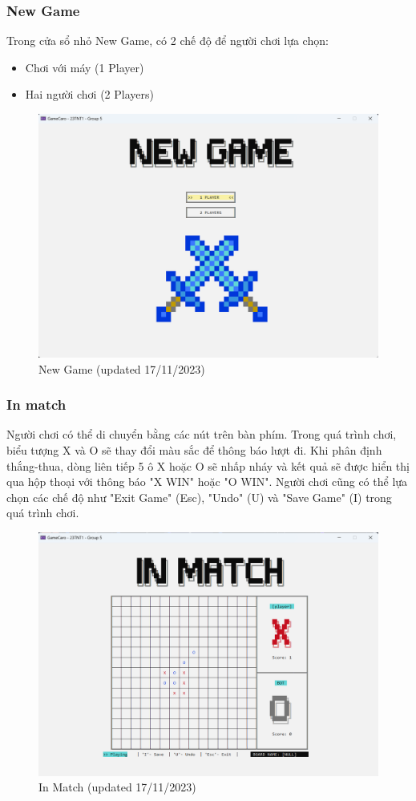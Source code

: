 \subsubsection{New Game}
Trong cửa sổ nhỏ New Game, có 2 chế độ để người chơi lựa chọn:
\begin{itemize}
    \item Chơi với máy (1 Player)
    \item Hai người chơi (2 Players)
\end{itemize}
\begin{figure}[H]
    \centering
    \includegraphics[scale=.4]{img/newgame.png}
    \caption{New Game (updated 17/11/2023)}
\end{figure}
\clearpage
\subsubsection{In match}
Người chơi có thể di chuyển bằng các nút trên bàn phím. Trong quá trình chơi, biểu tượng X và O sẽ thay đổi màu sắc để thông báo lượt đi. Khi phân định thắng-thua, dòng liên tiếp 5 ô X hoặc O sẽ nhấp nháy và kết quả sẽ được hiển thị qua hộp thoại với thông báo "X WIN" hoặc "O WIN". Người chơi cũng có thể lựa chọn các chế độ như "Exit Game" (Esc), "Undo" (U) và "Save Game" (I) trong quá trình chơi.
\begin{figure}[H]
    \centering
    \includegraphics[scale=.4]{img/inmatch.png}
    \caption{In Match (updated 17/11/2023)}
\end{figure}
\clearpage
